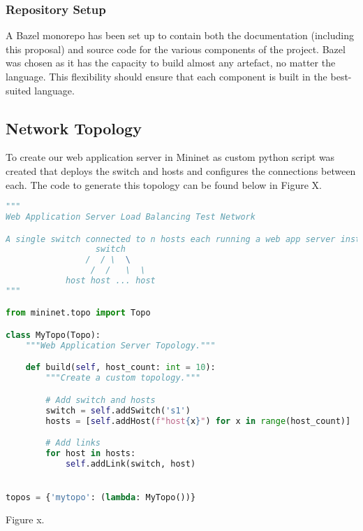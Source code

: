 \subsubsection{Repository Setup}
A Bazel \cite{bazel_2022} monorepo has been set up to contain both the documentation (including this proposal) and source code for the various components of the project. Bazel was chosen as it has the capacity to build almost any artefact, no matter the language. This flexibility should ensure that each component is built in the best-suited language.

\subsection{Network Topology}
To create our web application server in Mininet as custom python script was created that deploys the switch and hosts and configures the connections between each. The code to generate this topology can be found below in Figure X.

\begin{lstlisting}[language=python]
"""
Web Application Server Load Balancing Test Network

A single switch connected to n hosts each running a web app server instance:
                  switch
                /  / \  \
	             /  /   \  \                
  	        host host ... host
"""

from mininet.topo import Topo

class MyTopo(Topo):
    """Web Application Server Topology."""

    def build(self, host_count: int = 10):
        """Create a custom topology."""

        # Add switch and hosts
        switch = self.addSwitch('s1')
        hosts = [self.addHost(f"host{x}") for x in range(host_count)]

        # Add links
        for host in hosts:
            self.addLink(switch, host)


topos = {'mytopo': (lambda: MyTopo())} 
\end{lstlisting}
\begin{center}
Figure x.
\end{center}

